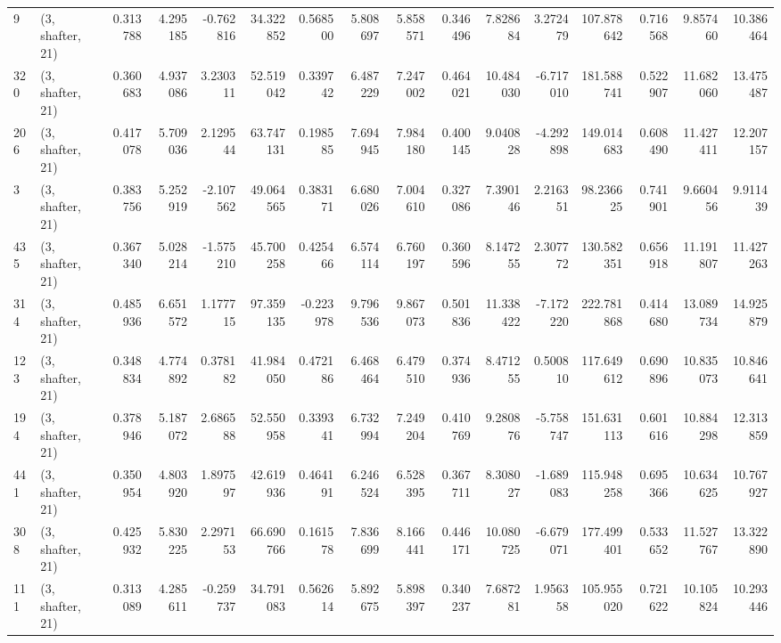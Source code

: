 \begin{tabular}{llrrrrrrrrrrrrrr}
9   &  (3, shafter, 21) &   0.313788 &   4.295185 &  -0.762816 &    34.322852 &   0.568500 &   5.808697 &   5.858571 &  0.346496 &   7.828684 &   3.272479 &   107.878642 &   0.716568 &   9.857460 &  10.386464 \\
320 &  (3, shafter, 21) &   0.360683 &   4.937086 &   3.230311 &    52.519042 &   0.339742 &   6.487229 &   7.247002 &  0.464021 &  10.484030 &  -6.717010 &   181.588741 &   0.522907 &  11.682060 &  13.475487 \\
206 &  (3, shafter, 21) &   0.417078 &   5.709036 &   2.129544 &    63.747131 &   0.198585 &   7.694945 &   7.984180 &  0.400145 &   9.040828 &  -4.292898 &   149.014683 &   0.608490 &  11.427411 &  12.207157 \\
3   &  (3, shafter, 21) &   0.383756 &   5.252919 &  -2.107562 &    49.064565 &   0.383171 &   6.680026 &   7.004610 &  0.327086 &   7.390146 &   2.216351 &    98.236625 &   0.741901 &   9.660456 &   9.911439 \\
435 &  (3, shafter, 21) &   0.367340 &   5.028214 &  -1.575210 &    45.700258 &   0.425466 &   6.574114 &   6.760197 &  0.360596 &   8.147255 &   2.307772 &   130.582351 &   0.656918 &  11.191807 &  11.427263 \\
314 &  (3, shafter, 21) &   0.485936 &   6.651572 &   1.177715 &    97.359135 &  -0.223978 &   9.796536 &   9.867073 &  0.501836 &  11.338422 &  -7.172220 &   222.781868 &   0.414680 &  13.089734 &  14.925879 \\
123 &  (3, shafter, 21) &   0.348834 &   4.774892 &   0.378182 &    41.984050 &   0.472186 &   6.468464 &   6.479510 &  0.374936 &   8.471255 &   0.500810 &   117.649612 &   0.690896 &  10.835073 &  10.846641 \\
194 &  (3, shafter, 21) &   0.378946 &   5.187072 &   2.686588 &    52.550958 &   0.339341 &   6.732994 &   7.249204 &  0.410769 &   9.280876 &  -5.758747 &   151.631113 &   0.601616 &  10.884298 &  12.313859 \\
441 &  (3, shafter, 21) &   0.350954 &   4.803920 &   1.897597 &    42.619936 &   0.464191 &   6.246524 &   6.528395 &  0.367711 &   8.308027 &  -1.689083 &   115.948258 &   0.695366 &  10.634625 &  10.767927 \\
308 &  (3, shafter, 21) &   0.425932 &   5.830225 &   2.297153 &    66.690766 &   0.161578 &   7.836699 &   8.166441 &  0.446171 &  10.080725 &  -6.679071 &   177.499401 &   0.533652 &  11.527767 &  13.322890 \\
111 &  (3, shafter, 21) &   0.313089 &   4.285611 &  -0.259737 &    34.791083 &   0.562614 &   5.892675 &   5.898397 &  0.340237 &   7.687281 &   1.956358 &   105.955020 &   0.721622 &  10.105824 &  10.293446 \\

\end{tabular}
